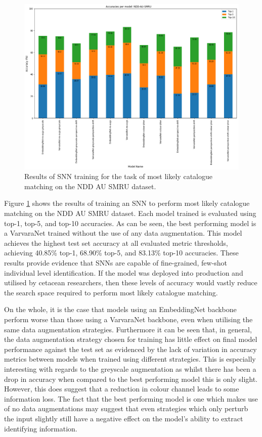 \begin{figure}[t]
	\begin{center}
		\includegraphics[scale=0.4]{Chapter5/figs/NDDAUSMRU-SNN-model-accuracies.png}
	\end{center}
	\caption{Results of SNN training for the task of most likely catalogue matching on the NDD AU SMRU dataset.}
	\label{fig:NDDAUSMRU-SNN-model-accuracies}
\end{figure}

Figure \ref{fig:NDDAUSMRU-SNN-model-accuracies} shows the results of training an SNN to perform most likely catalogue matching on the NDD AU SMRU dataset. Each model trained is evaluated using top-1, top-5, and top-10 accuracies. As can be seen, the best performing model is a VarvaraNet trained without the use of any data augmentation. This model achieves the highest test set accuracy at all evaluated metric thresholds, achieving 40.85\% top-1, 68.90\% top-5, and 83.13\% top-10 accuracies. These results provide evidence that SNNs are capable of fine-grained, few-shot individual level identification. If the model was deployed into production and utilised by cetacean researchers, then these levels of accuracy would vastly reduce the search space required to perform most likely catalogue matching.

On the whole, it is the case that models using an EmbeddingNet backbone perform worse than those using a VarvaraNet backbone, even when utilising the same data augmentation strategies. Furthermore it can be seen that, in general, the data augmentation strategy chosen for training has little effect on final model performance against the test set as evidenced by the lack of variation in accuracy metrics between models when trained using different strategies. This is especially interesting with regards to the greyscale augmentation as whilst there has been a drop in accuracy when compared to the best performing model this is only slight. However, this does suggest that a reduction in colour channel leads to some information loss. The fact that the best performing model is one which makes use of no data augmentations may suggest that even strategies which only perturb the input slightly still have a negative effect on the model's ability to extract identifying information. 

